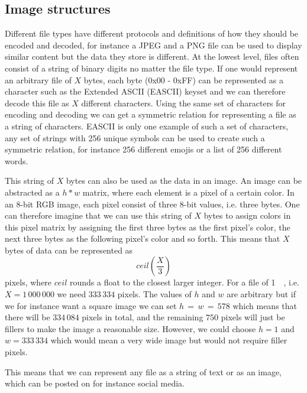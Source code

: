 \subsection{Image structures}
Different file types have different protocols and definitions of how they should be encoded and decoded, for instance a JPEG and a PNG file can be used to display similar content but the data they store is different. At the lowest level, files often consist of a string of binary digits no matter the file type. If one would represent an arbitrary file of $X$ bytes, each byte (0x00 - 0xFF) can be represented as a character such as the Extended ASCII (EASCII) keyset and we can therefore decode this file as $X$ different characters. Using the same set of characters for encoding and decoding we can get a symmetric relation for representing a file as a string of characters. EASCII is only one example of such a set of characters, any set of strings with 256 unique symbols can be used to create such a symmetric relation, for instance 256 different emojis or a list of 256 different words.

This string of $X$ bytes can also be used as the data in an image. An image can be abstracted as a $h * w$ matrix, where each element is a pixel of a certain color. In an 8-bit RGB image, each pixel consist of three 8-bit values, i.e. three bytes. One can therefore imagine that we can use this string of $X$ bytes to assign colors in this pixel matrix by assigning the first three bytes as the first pixel's color, the next three bytes as the following pixel's color and so forth. This means that $X$ bytes of data can be represented as 
$$ceil(\frac{X}{3})$$ 
pixels, where $ceil$ rounds a float to the closest larger integer. For a file of \SI{1}{\mega\byte}, i.e. $X = 1\,000\,000$ we need $333\,334$ pixels. The values of $h$ and $w$ are arbitrary but if we for instance want a square image we can set $ h\,=\,w\,=\,578$ which means that there will be $334\,084$ pixels in total, and the remaining $750$ pixels will just be fillers to make the image a reasonable size. However, we could choose $h = 1$ and $w = 333\,334$ which would mean a very wide image but would not require filler pixels. 

This means that we can represent any file as a string of text or as an image, which can be posted on for instance social media. 